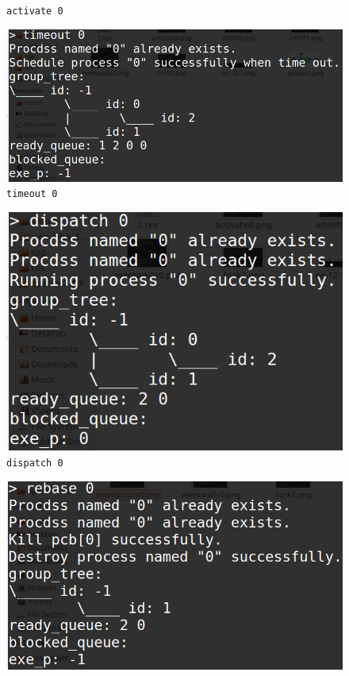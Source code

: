 \documentclass[11pt]{article}
\begin{document}
\begin{center}
\begin{figure}[htbp]
\caption{\texttt{activate 0}}
\label{fig: activate0}
\end{figure}
\begin{figure}[htbp]
\includegraphics[width=\textwidth]{timeout0.png}
\caption{\texttt{timeout 0}}
\label{fig: timeout0}
\end{figure}
\begin{figure}[htbp]
\includegraphics[width=\textwidth]{dispatch0aftertimout0.png}
\caption{\texttt{dispatch 0}}
\label{fig: dispatch0aftertimout0}
\end{figure}
\begin{figure}[htbp]
\includegraphics[width=\textwidth]{rebase0.png}

\end{figure}
\end{center}
\end{document}
